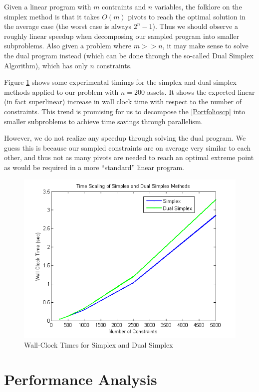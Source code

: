 \documentclass[12pt]{article}
\begin{document}
Given a linear program with $m$ contraints and $n$ variables, the folklore on the simplex method is that it takes $O(m)$ pivots to reach the optimal solution in the average case (the worst case is always $2^n - 1$).
Thus we should observe a roughly linear speedup when decomposing our sampled program into smaller subproblems.
Also given a problem where $m >> n$, it may make sense to solve the dual program instead (which can be done through the so-called Dual Simplex Algorithm), which has only $n$ constraints.

Figure \ref{fig:fig_simplex_time} shows some experimental timings for the simplex and dual simplex methods applied to our problem with $n = 200$ assets.
It shows the expected linear (in fact superlinear) increase in wall clock time with respect to the number of constraints.
This trend is promising for us to decompose the \ref{Portfolioscp} into smaller subproblems to achieve time savings through parallelism.

However, we do not realize any speedup through solving the dual program.  
We guess this is because our sampled constraints are on average very similar to each other, and thus not as many pivots are needed to reach an optimal extreme point as would be required in a more ``standard'' linear program.

\begin{figure}[ht]
	\centering
		\includegraphics{../plot/figs/fig_simplex_time.png}
	\caption{Wall-Clock Times for Simplex and Dual Simplex}
	\label{fig:fig_simplex_time}
\end{figure}

\section*{Performance Analysis}
\end{document}
